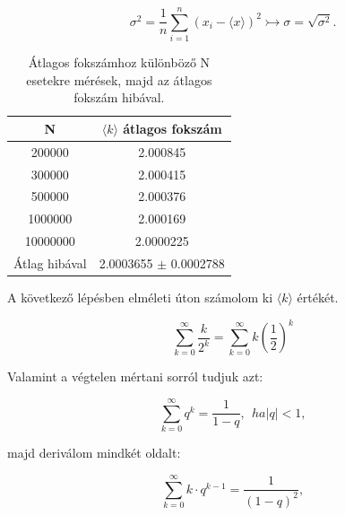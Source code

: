 \documentclass[a4paper, 12pt]{article}
\numberwithin{equation}{section}          %
\numberwithin{figure}{subsection}
\begin{document}
\begin{center}
	\begin{equation}
	\sigma^2 = \frac{1}{n}\sum_{i = 1}^{n}\left( x_i - \langle x\rangle \right)^2 \rightarrowtail \sigma = \sqrt{\sigma^2}.
	\end{equation}
\end{center}

\begin{table}[h!]
\begin{center}
\begin{tabular}{||c|c||}
	\hline
	N & $\langle k \rangle$ átlagos fokszám \\  \hline
	200000 & 2.000845 \\	\hline
	300000 & 2.000415 \\	\hline
	500000 & 2.000376 \\	\hline
	1000000 & 2.000169 \\	\hline
	10000000 & 2.0000225 \\	\hline
	Átlag hibával & 2.0003655 $\pm$ 0.0002788 \\  \hline
\end{tabular}
\caption{Átlagos fokszámhoz különböző N esetekre mérések, majd az átlagos fokszám hibával.}
\end{center}
\end{table}

A következő lépésben elméleti úton számolom ki $\langle k \rangle$ értékét.

\begin{center}
	\begin{equation}
	\sum_{k = 0}^{\infty} \frac{k}{2^k} = \sum_{k = 0}^{\infty} k\left( \frac{1}{2}\right)^k
	\end{equation}
\end{center}

Valamint a végtelen mértani sorról tudjuk azt:
\begin{center}
	\begin{equation}
	\sum_{k = 0}^{\infty} q^k = \frac{1}{1 - q},\ \ ha |q|<1, 
	\end{equation}
	\label{kell}
\end{center}

majd deriválom mindkét oldalt:

\begin{center}
	\begin{equation}
	\sum_{k = 0}^{\infty} k \cdot q^{k-1} = \frac{1}{(1 - q)^2}, 
	\end{equation}
\end{center}
\end{document}
